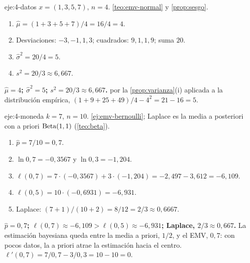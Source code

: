 \begin{solucion}{eje:4-datos}
\datos $x=(1,3,5,7)$, $n=4$.
\planteamiento \cref{teo:emv-normal} y \cref{prop:sesgo}.
\pasos
\begin{enumerate}[label=\arabic*.]
  \item $\hat\mu=(1+3+5+7)/4=16/4=4$.
  \item Desviaciones: $-3,-1,1,3$; cuadrados: $9,1,1,9$; suma $20$.
  \item $\hat\sigma^{2}=20/4=5$.
  \item $s^{2}=20/3\approx 6{,}667$.
\end{enumerate}
\resultado \textbf{$\hat\mu=4$; $\hat\sigma^{2}=5$; $s^{2}=20/3\approx 6{,}667$.}
\comprobacion por la \cref{prop:varianza}(i) aplicada a la distribución empírica, $(1+9+25+49)/4-4^{2}=21-16=5$.
\end{solucion}

\begin{solucion}{eje:4-moneda}
\datos $k=7$, $n=10$.
\planteamiento \cref{ej:emv-bernoulli}; Laplace es la media a posteriori con a priori $\operatorname{Beta}(1,1)$ (\cref{teo:beta}).
\pasos
\begin{enumerate}[label=\arabic*.]
  \item $\hat p=7/10=0{,}7$.
  \item $\ln 0{,}7=-0{,}3567$ y $\ln 0{,}3=-1{,}204$.
  \item $\ell(0{,}7)=7\cdot(-0{,}3567)+3\cdot(-1{,}204)=-2{,}497-3{,}612=-6{,}109$.
  \item $\ell(0{,}5)=10\cdot(-0{,}6931)=-6{,}931$.
  \item Laplace: $(7+1)/(10+2)=8/12=2/3\approx 0{,}6667$.
\end{enumerate}
\resultado \textbf{$\hat p=0{,}7$; $\ell(0{,}7)\approx-6{,}109>\ell(0{,}5)\approx-6{,}931$; Laplace, $2/3\approx 0{,}667$.} La estimación bayesiana queda entre la media a priori, $1/2$, y el EMV, $0{,}7$: con pocos datos, la a priori atrae la estimación hacia el centro.
\comprobacion $\ell'(0{,}7)=7/0{,}7-3/0{,}3=10-10=0$.
\end{solucion}

